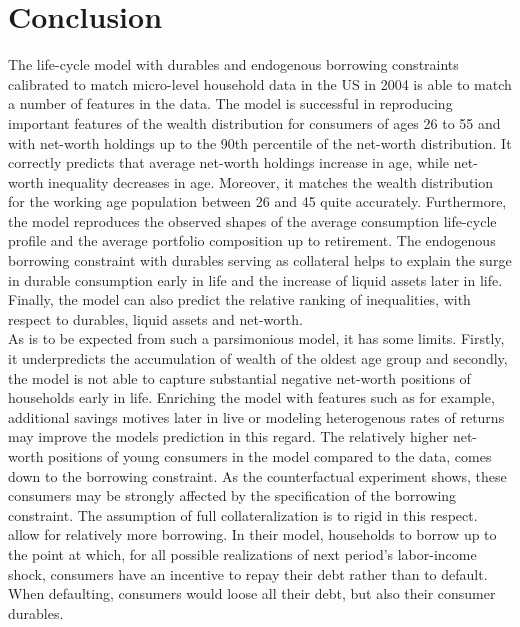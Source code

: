 \documentclass[a4paper,12pt,legno]{article}
\begin{document}
\section{Conclusion}
\label{conclusion}
The life-cycle model with durables and endogenous borrowing constraints calibrated to match micro-level household data in the US in 2004 is able to match a number of features in the data. The model is successful in reproducing important features of the wealth distribution for consumers of ages 26 to 55 and with net-worth holdings up to the 90th percentile of the net-worth distribution. It correctly predicts that average net-worth holdings increase in age, while net-worth inequality decreases in age. Moreover, it matches the wealth distribution for the working age population between 26 and 45 quite accurately. Furthermore, the model reproduces the observed shapes of the average consumption life-cycle profile and the average portfolio composition up to retirement. The endogenous borrowing constraint with durables serving as collateral helps to explain the surge in durable consumption early in life and the increase of liquid assets later in life. Finally, the model can also predict the relative ranking of inequalities, with respect to durables, liquid assets and net-worth. \\
As is to be expected from such a parsimonious model, it has some limits. Firstly, it underpredicts the accumulation of wealth of the oldest age group and secondly, the model is not able to capture substantial negative net-worth positions of households early in life. Enriching the model with features such as for example, additional savings motives later in live \citep{de2004wealth} or modeling heterogenous rates of returns \citep{benhabib2011distribution} may improve the models prediction in this regard. The relatively higher net-worth positions of young consumers in the model compared to the data, comes down to the borrowing constraint. As the counterfactual experiment shows, these consumers may be strongly affected by the specification of the borrowing constraint. The assumption of full collateralization is to rigid in this respect. \cite{FV&K2011} allow for relatively more borrowing. In their model, households to borrow up to the point at which, for all possible realizations of next period's labor-income shock, consumers  have an incentive to repay their debt rather than to default. When defaulting, consumers would loose all their debt, but also their consumer durables.


\end{document}
